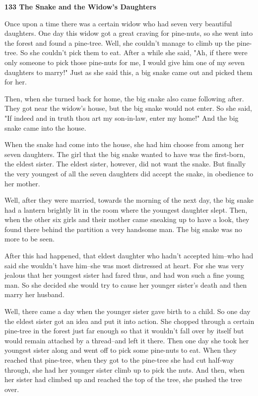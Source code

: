 
\textbf{133 The Snake and the Widow's Daughters}

Once upon a time there was a certain widow who had seven very beautiful daughters.
One day this widow got a great craving for pine-nuts, so she went into the forest
and found a pine-tree. Well, she couldn't manage to climb up the pine-tree. So
she couldn't pick them to eat. After a while she said, "Ah, if there were
only someone to pick those pine-nuts for me, I would give him one of my seven daughters
to marry!" Just as she said this, a big snake came out and picked them
for her.

Then, when she turned back for home, the big snake also came following after. They
got near the widow's house, but the big snake would not enter. So she said, "If
indeed and in truth thou art my son-in-law, enter my home!" And the big
snake came into the house.

When the snake had come into the house, she had him choose from among her seven
daughters. The girl that the big snake wanted to have was the first-born, the eldest
sister. The eldest sister, however, did not want the snake. But finally the very
youngest of all the seven daughters did accept the snake, in obedience to her mother.

Well, after they were married, towards the morning of the next day, the big snake
had a lantern brightly lit in the room where the youngest daughter slept. Then,
when the other six girls and their mother came sneaking up to have a look, they
found there behind the partition a very handsome man. The big snake was no more
to be seen.

After this had happened, that eldest daughter who hadn't accepted him--who had
said she wouldn't have him--she was most distressed at heart. For she was very
jealous that her youngest sister had fared thus, and had won such a fine young
man. So she decided she would try to cause her younger sister's death and then
marry her husband.

Well, there came a day when the younger sister gave birth to a child. So one day
the eldest sister got an idea and put it into action. She chopped through a certain
pine-tree in the forest just far enough so that it wouldn't fall over by itself
but would remain attached by a thread--and left it there. Then one day she took
her youngest sister along and went off to pick some pine-nuts to eat. When they
reached that pine-tree, when they got to the pine-tree she had cut half-way through,
she had her younger sister climb up to pick the nuts. And then, when her sister
had climbed up and reached the top of the tree, she pushed the tree over.

